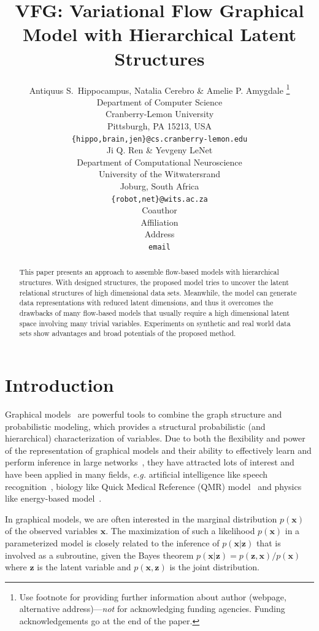 \documentclass{article} %
\title{VFG: Variational Flow Graphical Model with Hierarchical Latent Structures\\
}
\author{Antiquus S.~Hippocampus, Natalia Cerebro \& Amelie P. Amygdale \thanks{ Use footnote for providing further information
about author (webpage, alternative address)---\emph{not} for acknowledging
funding agencies.  Funding acknowledgements go at the end of the paper.} \\
Department of Computer Science\\
Cranberry-Lemon University\\
Pittsburgh, PA 15213, USA \\
\texttt{\{hippo,brain,jen\}@cs.cranberry-lemon.edu} \\
\And
Ji Q. Ren \& Yevgeny LeNet \\
Department of Computational Neuroscience \\
University of the Witwatersrand \\
Joburg, South Africa \\
\texttt{\{robot,net\}@wits.ac.za} \\
\AND
Coauthor \\
Affiliation \\
Address \\
\texttt{email}
}
\begin{document}
\maketitle

\begin{abstract}
This paper presents an approach to  assemble flow-based models with hierarchical structures.  With  designed  structures, the proposed model tries to uncover the latent relational structures of  high dimensional data sets.  Meanwhile, the model can generate  data representations with reduced latent dimensions, and thus it overcomes the drawbacks of many flow-based models that usually require a high dimensional latent space involving many trivial variables.  Experiments on synthetic and real world data sets show advantages and broad potentials of the proposed method. 
\end{abstract}


\section{Introduction}
Graphical models~\citep{madigan1995bayesian,hruschka2007bayesian} are powerful tools to combine the graph structure and probabilistic modeling, which provides a structural probabilistic (and hierarchical) characterization of variables. 
Due to both the flexibility and power of the representation of graphical models and their ability to effectively learn and
perform inference in large networks~\cite{koller2007graphical}, they have attracted lots of interest and have been applied in many fields, \textit{e.g.} artificial intelligence like speech recognition~\citep{bilmes2005graphical}, biology like Quick Medical Reference (QMR) model~\citep{shwe1990probabilistic} and physics like energy-based model~\citep{jordan2004graphical}.

In graphical models, we are often interested in the marginal distribution $p(\mathbf{x})$ of the observed variables $\mathbf{x}$. The maximization of such a likelihood $p(\mathbf{x})$ in a parameterized model is closely related to the inference of $p(\mathbf{x}|\mathbf{z})$ that is involved as a subroutine, given the Bayes theorem $p(\mathbf{x}|\mathbf{z}) = p(\mathbf{z}, \mathbf{x}) / p(\mathbf{x})$ where $\mathbf{z}$ is the latent variable and $p(\mathbf{x}, \mathbf{z})$ is the joint distribution. 
\end{document}
